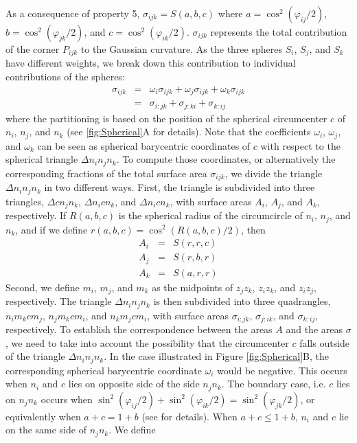 \documentclass[11 pt]{article}
\theoremstyle{plain} \theorembodyfont{\rmfamily}
\begin{document}
 As a consequence of property 5, $\sigma_{ijk}=S(a,b,c)$ where $a=\cos^2(\varphi_{ij}/2)$, $b=\cos^2(\varphi_{jk}/2)$, and $c=\cos^2(\varphi_{ik}/2)$. $\sigma_{ijk}$ represents the total contribution of the corner $P_{ijk}$ to the Gaussian curvature. As the three spheres $S_i$, $S_j$, and $S_k$ have different weights, we break down this contribution to individual contributions of the spheres:
 \begin{eqnarray} 
  \sigma_{ijk} &=& \omega_i \sigma_{ijk}  + \omega_j \sigma_{ijk} + \omega_k \sigma_{ijk} \nonumber \\
  &=& \sigma_{i:jk}  +  \sigma_{j:ki} +  \sigma_{k: ij} 
 \end{eqnarray}
where the partitioning is based on the position of the spherical circumcenter $c$ of $n_i$, $n_j$, and $n_k$ (see \ref{fig:Spherical}A for details). Note that the coefficients $\omega_i$, $\omega_j$, and $\omega_k$ can be seen as spherical barycentric coordinates of $c$ with respect to the spherical triangle $\Delta n_i n_j n_k$. To compute those coordinates, or alternatively the corresponding fractions of the total surface area $\sigma_{ijk}$, we divide the triangle $\Delta n_i n_j n_k$ in two different ways. First, the triangle is subdivided into three triangles, $\Delta c n_j n_k$, $\Delta n_i c n_k$, and $\Delta n_i c n_k$, with surface areas $A_i$, $A_j$, and $A_k$, respectively. If $R(a,b,c)$ is the spherical radius of the circumcircle of $n_i$, $n_j$, and $n_k$, and if we define $r(a,b,c)=\cos^2(R(a,b,c)/2)$, then
\begin{eqnarray}
A_i &=& S(r,r,c) \nonumber \\
A_j &=& S(r,b,r) \nonumber \\
A_k &=& S(a,r,r) 
\end{eqnarray}
Second, we define $m_i$, $m_j$, and $m_k$ as the midpoints of $z_j z_k$, $z_i z_k$, and $z_i z_j$, respectively. The triangle $\Delta n_i n_j n_k$ is then subdivided into three quadrangles, $n_i m_k c m_j$, $n_j m_k c m_i$, and $n_k m_j c m_i$, with surface areas $\sigma_{i:jk}$, $\sigma_{j:ik}$, and $\sigma_{k:ij}$, respectively. To establish the correspondence between the areas $A$ and the areas $\sigma$, we need to take into account the possibility that the circumcenter $c$ falls outside of the triangle $\Delta n_i n_j n_k$. In the case illustrated in Figure \ref{fig:Spherical}B, the corresponding spherical barycentric coordinate $\omega_i$ would be negative. This occurs when $n_i$ and $c$ lies on opposite side of the side $n_j n_k$. The boundary case, i.e. $c$ lies on $n_j n_k$ occurs when $\sin^2 (\varphi_{ij}/2) + \sin^2 (\varphi_{ik}/2) = \sin^2 (\varphi_{jk}/2)$, or equivalently when $a + c = 1 + b$ (see \cite{AkEd19b} for details). When $a+c \le 1 +b$, $n_i$ and $c$ lie on the same side of $n_j n_k$. We define
\end{document}
